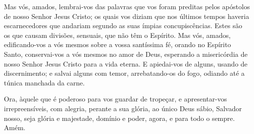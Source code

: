 Mas vós, amados, lembrai-vos das palavras que vos foram preditas
pelos apóstolos de nosso Senhor Jesus Cristo; os quais vos
diziam que nos últimos tempos haveria escarnecedores que andariam
segundo as suas ímpias concupiscências. Estes são os que
causam divisões, sensuais, que não têm o Espírito. Mas vós,
amados, edificando-vos a vós mesmos sobre a vossa santíssima fé,
orando no Espírito Santo, conservai-vos a vós mesmos no amor
de Deus, esperando a misericórdia de nosso Senhor Jesus Cristo para
a vida eterna. E apiedai-vos de alguns, usando de
discernimento; e salvai alguns com temor, arrebatando-os do
fogo, odiando até a túnica manchada da carne.

Ora, àquele que é poderoso para vos guardar de tropeçar, e
apresentar-vos irrepreensíveis, com alegria, perante a sua glória,
ao único Deus sábio, Salvador nosso, seja glória e majestade,
domínio e poder, agora, e para todo o sempre. Amém.
